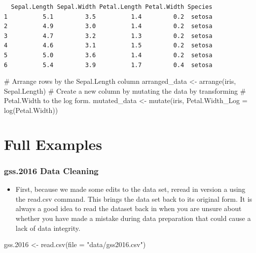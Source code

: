 \documentclass[
  letterpaper,
  DIV=11,
  numbers=noendperiod]{scrreprt}
\newenvironment{Shaded}{\begin{snugshade}}{\end{snugshade}}
\newcommand{\AttributeTok}[1]{\textcolor[rgb]{0.40,0.45,0.13}{#1}}
\newcommand{\CommentTok}[1]{\textcolor[rgb]{0.37,0.37,0.37}{#1}}
\newcommand{\FloatTok}[1]{\textcolor[rgb]{0.68,0.00,0.00}{#1}}
\newcommand{\FunctionTok}[1]{\textcolor[rgb]{0.28,0.35,0.67}{#1}}
\newcommand{\NormalTok}[1]{\textcolor[rgb]{0.00,0.23,0.31}{#1}}
\newcommand{\OtherTok}[1]{\textcolor[rgb]{0.00,0.23,0.31}{#1}}
\newcommand{\StringTok}[1]{\textcolor[rgb]{0.13,0.47,0.30}{#1}}
\providecommand{\tightlist}{%
  \setlength{\itemsep}{0pt}\setlength{\parskip}{0pt}}\usepackage{longtable,booktabs,array}
\begin{document}
\begin{verbatim}
  Sepal.Length Sepal.Width Petal.Length Petal.Width Species
1          5.1         3.5          1.4         0.2  setosa
2          4.9         3.0          1.4         0.2  setosa
3          4.7         3.2          1.3         0.2  setosa
4          4.6         3.1          1.5         0.2  setosa
5          5.0         3.6          1.4         0.2  setosa
6          5.4         3.9          1.7         0.4  setosa
\end{verbatim}

\begin{Shaded}
\begin{Highlighting}[]
\CommentTok{\# Arrange rows by the Sepal.Length column}
\NormalTok{arranged\_data }\OtherTok{\textless{}{-}} \FunctionTok{arrange}\NormalTok{(iris, Sepal.Length)}
\CommentTok{\# Create a new column by mutating the data by transforming}
\CommentTok{\# Petal.Width to the log form.}
\NormalTok{mutated\_data }\OtherTok{\textless{}{-}} \FunctionTok{mutate}\NormalTok{(iris, }\AttributeTok{Petal.Width\_Log =} \FunctionTok{log}\NormalTok{(Petal.Width))}
\end{Highlighting}
\end{Shaded}


\chapter{Full Examples}\label{full-examples}

\subsection{gss.2016 Data Cleaning}\label{gss.2016-data-cleaning}

\begin{itemize}
\tightlist
\item
  First, because we made some edits to the data set, reread in version a
  using the read.csv command. This brings the data set back to its
  original form. It is always a good idea to read the dataset back in
  when you are unsure about whether you have made a mistake during data
  preparation that could cause a lack of data integrity.\\
\end{itemize}

\begin{Shaded}
\begin{Highlighting}[]
\NormalTok{gss}\FloatTok{.2016} \OtherTok{\textless{}{-}} \FunctionTok{read.csv}\NormalTok{(}\AttributeTok{file =} \StringTok{"data/gss2016.csv"}\NormalTok{)}
\end{Highlighting}
\end{Shaded}
\end{document}
